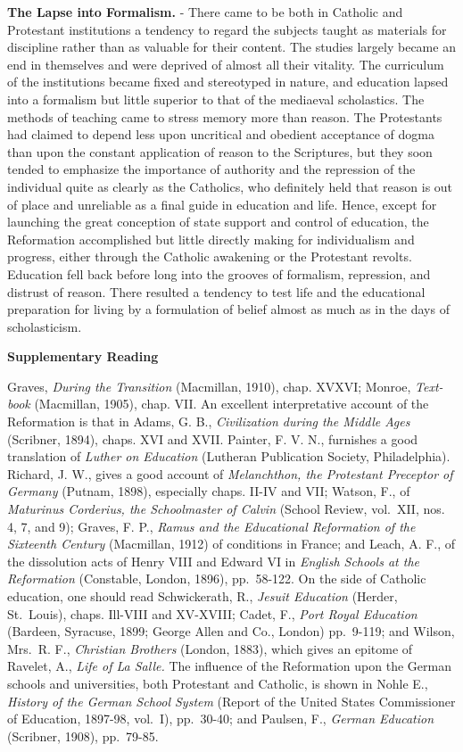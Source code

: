 \documentclass[]{book}
\begin{document}
\textbf{The Lapse into Formalism.} - There came to be both in Catholic and Protestant institutions a tendency to regard the subjects taught as materials for discipline rather than as valuable for their content. The studies largely became an end in themselves and were deprived of almost all their vitality. The curriculum of the institutions became fixed and stereotyped in nature, and education lapsed into a formalism but little superior to that of the mediaeval scholastics. The methods of teaching came to stress memory more than reason. The Protestants had claimed to depend less upon uncritical and obedient acceptance of dogma than upon the constant application of reason to the Scriptures, but they soon tended to emphasize the importance of authority and the repression of the individual quite as clearly as the Catholics, who definitely held that reason is out of place and unreliable as a final guide in education and life. Hence, except for launching the great conception of state support and control of education, the Reformation accomplished but little directly making for individualism and progress, either through the Catholic awakening or the Protestant revolts. Education fell back before long into the grooves of formalism, repression, and distrust of reason. There resulted a tendency to test life and the educational preparation for living by a formulation of belief almost as much as in the days of scholasticism.

\textbf{Supplementary Reading}

Graves, \emph{During the Transition} (Macmillan, 1910), chap. XVXVI; Monroe, \emph{Text-book} (Macmillan, 1905), chap. VII. An excellent interpretative account of the Reformation is that in Adams, G. B., \emph{Civilization during the Middle Ages} (Scribner, 1894), chaps. XVI and XVII. Painter, F. V. N., furnishes a good translation of \emph{Luther on Education} (Lutheran Publication Society, Philadelphia). Richard, J. W., gives a good account of \emph{Melanchthon, the Protestant Preceptor of Germany} (Putnam, 1898), especially chaps. II-IV and VII; Watson, F., of \emph{Maturinus Corderius, the Schoolmaster of Calvin} (School Review, vol.~XII, nos. 4, 7, and 9); Graves, F. P., \emph{Ramus and the Educational Reformation of the Sixteenth Century} (Macmillan, 1912) of conditions in France; and Leach, A. F., of the dissolution acts of Henry VIII and Edward VI in \emph{English Schools at the Reformation} (Constable, London, 1896), pp.~58-122. On the side of Catholic education, one should read Schwickerath, R., \emph{Jesuit Education} (Herder, St.~Louis), chaps. Ill-VIII and XV-XVIII; Cadet, F., \emph{Port Royal Education} (Bardeen, Syracuse, 1899; George Allen and Co., London) pp.~9-119; and Wilson, Mrs.~R. F., \emph{Christian Brothers} (London, 1883), which gives an epitome of Ravelet, A., \emph{Life of La Salle.} The influence of the Reformation upon the German schools and universities, both Protestant and Catholic, is shown in Nohle E., \emph{History of the German School System} (Report of the United States Commissioner of Education, 1897-98, vol.~I), pp.~30-40; and Paulsen, F., \emph{German Education} (Scribner, 1908), pp.~79-85.
\end{document}
